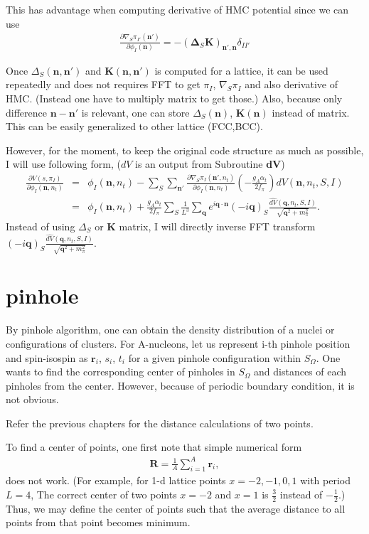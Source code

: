 \documentclass[10pt]{book}
\def\bm{\boldsymbol}
\newcommand{\bea}{\begin{eqnarray}}
\newcommand{\eea}{\end{eqnarray}}
\newcommand{\no}{\nonumber \\}
\newcommand{\del}{\partial}
\def\vn{{\bm n}}
\def\vq{{\bm q}}
\begin{document}
This has advantage when computing derivative of HMC potential since we can use 
\bea 
\frac{\del \nabla_S\pi_{I'}(\vn')}{\del \phi_I(\vn)}= -\left({\bm \Delta_S} {\bm K}\right)_{\vn',\vn}\delta_{II'}
\eea 

Once $\Delta_S(\vn,\vn')$ and ${\bm K}(\vn,\vn')$ is computed for a lattice,
it can be used repeatedly and does not requires FFT to get $\pi_I$, $\nabla_S\pi_I$ and also
derivative of HMC. (Instead one have to multiply matrix to get those.) 
Also, because only difference $\vn-\vn'$ is relevant, 
one can store $\Delta_S(\vn)$, ${\bm K}(\vn)$ instead of matrix. 
This can be easily generalized to other lattice (FCC,BCC). 

However, for the moment, to keep the original code structure as much as possible,
I will use following form, ($dV$ is an output from Subroutine {\bf dV})
\bea 
\frac{\del V(s,\pi_I)}{\del \phi_I(\vn,n_t)}&=&\phi_I(\vn,n_t)
-\sum_{S}\sum_{\vn'}\frac{\del \nabla_S\pi_I(\vn',n_t)}{\del \phi_I(\vn,n_t)} (-\frac{g_A\alpha_t}{2f_\pi})dV(\vn,n_t,S,I) \no 
&=& \phi_I(\vn,n_t)
+\frac{g_A\alpha_t}{2f_\pi} \sum_{S} 
\frac{1}{L^3}\sum_\vq e^{i\vq\cdot\vn}(-i\vq)_S \frac{ \widehat{dV}(\vq,n_t,S,I)}{\sqrt{\vq^2+m_\pi^2}}. 
\eea 
Instead of using $\Delta_S$ or ${\bm K}$ matrix, I will directly inverse FFT transform   
$(-i\vq)_S \frac{ \widehat{dV}(\vq,n_t,S,I)}{\sqrt{\vq^2+m_\pi^2}}$.

\section{pinhole}

By pinhole algorithm, one can obtain the density distribution of a nuclei or configurations of clusters.
For A-nucleons, let us represent i-th pinhole position and spin-isospin as ${\bm r}_i$, $s_i$, $t_i$
for a given pinhole configuration within $S_\Omega$. 
One wants to find the corresponding center of pinholes in $S_\Omega$ and 
distances of each pinholes from the center. 
However, because of periodic boundary condition, it is not obvious. 

Refer the previous chapters for the distance calculations of two points.

To find a center of points, one first note that simple numerical form
\bea 
{\bm R}=\frac{1}{A}\sum_{i=1}^A {\bm r}_i,
\eea 
does not work. (For example, for 1-d lattice points $x=-2,-1,0,1$ with period $L=4$, 
The correct center of two points $x=-2$ and $x=1$ is $\frac{3}{2}$ instead of $-\frac{1}{2}$.)
Thus, we may define the center of points such that the average distance to all points 
from that point becomes minimum. 
\end{document}
